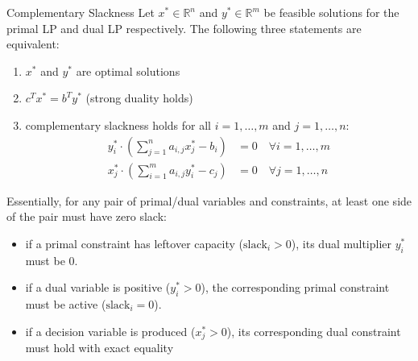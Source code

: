 \documentclass[a4paper, 11pt]{report}
\begin{document}
\begin{thmframe}{Complementary Slackness}{}
Let $x^* \in \mathbb{R}^n$ and $y^* \in \mathbb{R}^m$ be feasible solutions for the primal LP and dual LP respectively. The following three statements are equivalent:
\begin{enumerate}
    \item $x^*$ and $y^*$ are optimal solutions
    \item $c^T x^* = b^T y^*$ (strong duality holds)
    \item complementary slackness holds for all $i=1,\dots,m$ and $j=1,\dots,n$:
    \begin{align*}
        y_i^* \cdot \left( \sum_{j=1}^n a_{i,j}x_j^* - b_i \right) &= 0 \quad \forall i = 1, \dots, m \\
        x_j^* \cdot \left( \sum_{i=1}^m a_{i,j}y_i^* - c_j \right) &= 0 \quad \forall j = 1, \dots, n
    \end{align*}
\end{enumerate}

Essentially, for any pair of primal/dual variables and constraints, at least one side of the pair must have zero slack:
\begin{itemize}
    \item if a primal constraint has leftover capacity ($\text{slack}_i > 0$), its dual multiplier $y_i^*$ must be $0$.
    \item if a dual variable is positive ($y_i^* > 0$), the corresponding primal constraint must be active ($\text{slack}_i = 0$).
    \item if a decision variable is produced ($x_j^* > 0$), its corresponding dual constraint must hold with exact equality
\end{itemize}
\end{thmframe}
\end{document}
